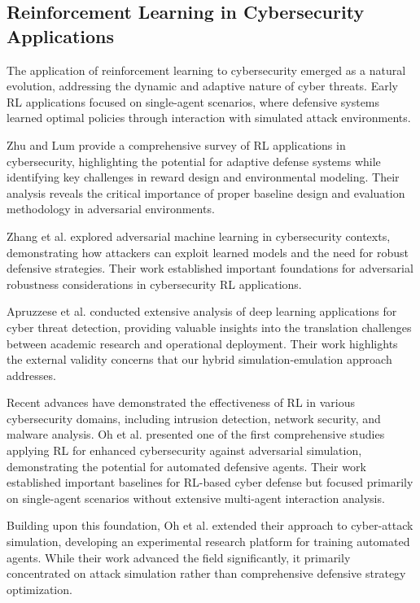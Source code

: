 \documentclass[12pt,oneside]{article}
\begin{document}
\subsection{Reinforcement Learning in Cybersecurity Applications}

The application of reinforcement learning to cybersecurity emerged as a natural evolution, addressing the dynamic and adaptive nature of cyber threats. Early RL applications focused on single-agent scenarios, where defensive systems learned optimal policies through interaction with simulated attack environments.

Zhu and Lum \cite{zhu2021survey} provide a comprehensive survey of RL applications in cybersecurity, highlighting the potential for adaptive defense systems while identifying key challenges in reward design and environmental modeling. Their analysis reveals the critical importance of proper baseline design and evaluation methodology in adversarial environments.

Zhang et al. \cite{zhang2020adversarial} explored adversarial machine learning in cybersecurity contexts, demonstrating how attackers can exploit learned models and the need for robust defensive strategies. Their work established important foundations for adversarial robustness considerations in cybersecurity RL applications.

Apruzzese et al. \cite{apruzzese2022deep} conducted extensive analysis of deep learning applications for cyber threat detection, providing valuable insights into the translation challenges between academic research and operational deployment. Their work highlights the external validity concerns that our hybrid simulation-emulation approach addresses.

Recent advances have demonstrated the effectiveness of RL in various cybersecurity domains, including intrusion detection, network security, and malware analysis. Oh et al. \cite{oh2023applying} presented one of the first comprehensive studies applying RL for enhanced cybersecurity against adversarial simulation, demonstrating the potential for automated defensive agents. Their work established important baselines for RL-based cyber defense but focused primarily on single-agent scenarios without extensive multi-agent interaction analysis.

Building upon this foundation, Oh et al. \cite{oh2024employing} extended their approach to cyber-attack simulation, developing an experimental research platform for training automated agents. While their work advanced the field significantly, it primarily concentrated on attack simulation rather than comprehensive defensive strategy optimization.
\end{document}
